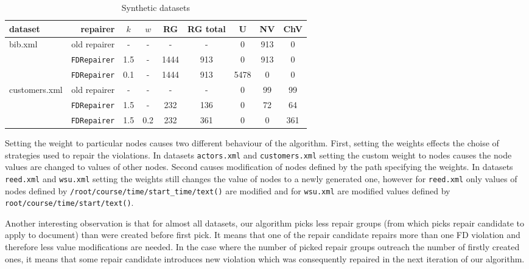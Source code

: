 \begin{table}
    \begin{tabular}{| l | r | *{7}{c|}}
    \hline
    dataset & repairer & $k$ & $w$ & RG & RG total & U & NV & ChV\\ \hline
    \multirow{3}{*}{bib.xml} & old repairer & - & - & - & - & 0 & 913 & 0\\
    & \texttt{FDRepairer} & 1.5 & - & 1444 & 913 & 0 & 913 & 0\\
    & \texttt{FDRepairer} & 0.1 & - & 1444 & 913 & 5478 & 0 & 0\\ \hline
    \multirow{3}{*}{customers.xml} & old repairer & - & - & - & - & 0 & 99 & 99\\
    & \texttt{FDRepairer} & 1.5 & - & 232 & 136 & 0 & 72 & 64\\
    & \texttt{FDRepairer} & 1.5 & 0.2 & 232 & 361 & 0 & 0 & 361\\\hline
    \end{tabular}
\caption{Synthetic datasets}
\label{syntheticTable}
\end{table}

Setting the weight to particular nodes causes two different behaviour of the algorithm. First, setting the weights effects the choise of strategies used to repair the violations. In datasets \texttt{actors.xml} and \texttt{customers.xml} setting the custom weight to nodes causes the node values are changed to values of other nodes. Second causes modification of nodes defined by the path specifying the weights. In datasets \texttt{reed.xml} and \texttt{wsu.xml} setting the weights still changes the value of nodes to a newly generated one, however for \texttt{reed.xml} only values of nodes defined by \texttt{/root/course/time/start\_time/\discretionary{}{}{}text()} are modified and for \texttt{wsu.xml} are modified values defined by \texttt{root/\discretionary{}{}{}course/time/start/text()}.


Another interesting observation is that for almost all datasets, our algorithm picks less repair groups (from which picks repair candidate to apply to document) than were created before first pick. It means that one of the repair candidate repairs more than one FD violation and therefore less value modifications are needed. In the case where the number of picked repair groups outreach the number of firstly created ones, it means that some repair candidate introduces new violation which was consequently repaired in the next iteration of our algorithm.
